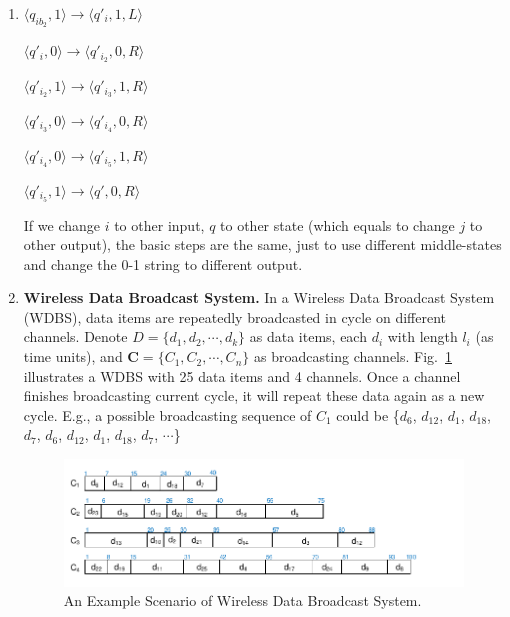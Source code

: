\documentclass[12pt,a4paper]{article}
\makeatletter
\newtheorem*{solution}{Solution}
\theoremstyle{definition}
\renewenvironment{solution}[1][Solution] {\par\pushQED{\qed}\normalfont\topsep6\p@\@plus6\p@\relax\trivlist\item[\hskip\labelsep\bfseries#1\@addpunct{.}]\ignorespaces}{\popQED\endtrivlist\@endpefalse} \makeatother
\makeatother
\begin{document}
\begin{enumerate}
\begin{solution}
\begin{minipage}{0.45\textwidth}
\begin{center}
			$\langle q_{ib_{2}},1\rangle\rightarrow\langle q'_{i},1,L\rangle$
			
			
			$\langle q'_{i},0\rangle\rightarrow\langle q'_{i_{2}},0,R\rangle$
			
			$\langle q'_{i_{2}},1\rangle\rightarrow\langle q'_{i_{3}},1,R\rangle$
			
			$\langle q'_{i_{3}},0\rangle\rightarrow\langle q'_{i_{4}},0,R\rangle$
			
			$\langle q'_{i_{4}},0\rangle\rightarrow\langle q'_{i_{5}},1,R\rangle$
			
			$\langle q'_{i_{5}},1\rangle\rightarrow\langle q',0,R\rangle$
		\end{center}
	\end{minipage}
	
	If we change $ i $ to other input, $ q $ to other state (which equals to change $ j $ to other output), the basic steps are the same, just to use different middle-states and change the 0-1 string to different output.
\end{solution}

\item \textbf{Wireless Data Broadcast System.}
In a Wireless Data Broadcast System (WDBS), data items are repeatedly broadcasted in cycle on different channels. Denote $D = \{d_1, d_2,\cdots, d_k\}$ as data items, each $d_i$ with length $l_i$ (as time units), and $\mathbf{C}=\{C_1, C_2, \cdots, C_n\}$ as broadcasting channels. Fig.~\ref{Fig-Broadcast} illustrates a WDBS with 25 data items and 4 channels. Once a channel finishes broadcasting current cycle, it will repeat these data again as a new cycle. E.g., a possible broadcasting sequence of $C_1$ could be \{$d_6$, $d_{12}$, $d_1$, $d_{18}$, $d_7$, $d_6$, $d_{12}$, $d_1$, $d_{18}$, $d_7$, $\cdots$\}

\begin{figure}[h]
	\centering
	\includegraphics[scale=1]{Fig-Broadcast.pdf}
	\caption{An Example Scenario of Wireless Data Broadcast System.} \label{Fig-Broadcast}
\end{figure}


\end{enumerate}
\end{document}
